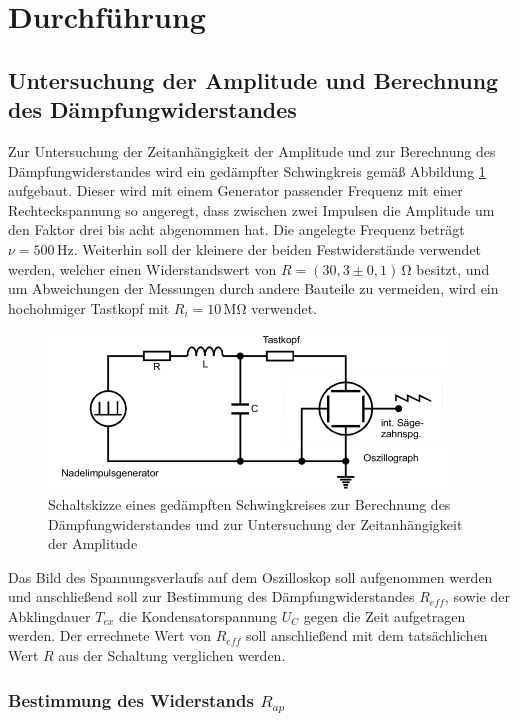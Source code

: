 \section{Durchführung}
\label{sec:Durchführung}

\subsection{Untersuchung der Amplitude und Berechnung des Dämpfungwiderstandes}

Zur Untersuchung der Zeitanhängigkeit der Amplitude und zur Berechnung des Dämpfungwiderstandes
wird ein gedämpfter Schwingkreis gemäß Abbildung \ref{fig:gsk2} aufgebaut. Dieser wird mit einem
Generator passender Frequenz mit einer Rechteckspannung so angeregt, dass zwischen zwei 
Impulsen die Amplitude um den Faktor drei 
bis acht abgenommen hat. Die angelegte Frequenz beträgt $\nu = 500\, \si{\hertz}$. Weiterhin
soll der kleinere der beiden Festwiderstände verwendet werden, welcher einen Widerstandswert
von $R = (30,3 \pm 0,1)\, \si{\ohm}$ besitzt,
und um Abweichungen der Messungen durch andere Bauteile zu vermeiden, wird ein hochohmiger 
Tastkopf mit $R_i = 10\, \si{\mega\ohm}$ verwendet.

\begin{figure}[H]
  \centering
  \includegraphics{content/aufgabeA.png}
  \caption{Schaltskizze eines gedämpften Schwingkreises zur Berechnung des Dämpfungwiderstandes und zur Untersuchung der Zeitanhängigkeit der Amplitude \cite{sample354}}
  \label{fig:gsk2}
\end{figure}
\noindent
Das Bild des Spannungsverlaufs auf dem Oszilloskop soll aufgenommen werden und anschließend soll
zur Bestimmung des Dämpfungwiderstandes $R_{eff}$, sowie der Abklingdauer $T_{ex}$ die Kondensatorspannung
$U_C$ gegen die Zeit aufgetragen werden. Der errechnete Wert von $R_{eff}$ soll anschließend mit dem
tatsächlichen Wert $R$ aus der Schaltung verglichen werden.



\subsubsection{Bestimmung des Widerstands $R_{ap}$}
\label{sec:ap}

